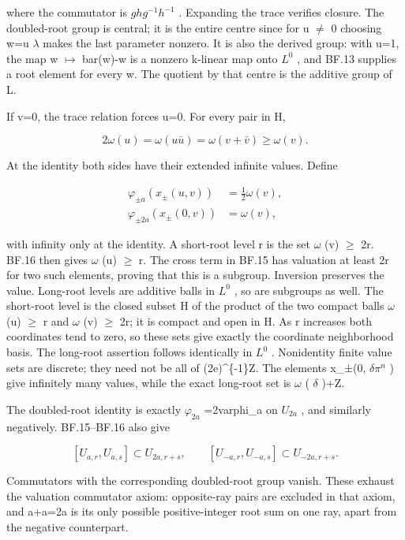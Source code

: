 \documentclass[
  11pt,
]{article}
\begin{document}
where the commutator is \(ghg^{-1} h^{-1}\) . Expanding the trace
verifies closure. The doubled-root group is central; it is the entire
centre since for u \(\ne\) 0 choosing w=u \(\lambda\) makes the last
parameter nonzero. It is also the derived group: with u=1, the map w
\(\mapsto\) bar(w)-w is a nonzero k-linear map onto \(L^0\) , and BF.13
supplies a root element for every w. The quotient by that centre is the
additive group of L.

If v=0, the trace relation forces u=0. For every pair in H,

\[
 2\omega(u)=\omega(u\bar u)
 =\omega(v+\bar v)\ge\omega(v).
 \tag{BF.16}
\]

At the identity both sides have their extended infinite values. Define

\[
 \begin{aligned}
 \varphi_{\pm a}(x_\pm(u,v))&=\tfrac12\omega(v),\\
 \varphi_{\pm2a}(x_\pm(0,v))&=\omega(v),
 \end{aligned}
 \tag{BF.17}
\]

with infinity only at the identity. A short-root level r is the set
\(\omega\) (v) \(\ge\) 2r. BF.16 then gives \(\omega\) (u) \(\ge\) r.
The cross term in BF.15 has valuation at least 2r for two such elements,
proving that this is a subgroup. Inversion preserves the value.
Long-root levels are additive balls in \(L^0\) , so are subgroups as
well. The short-root level is the closed subset H of the product of the
two compact balls \(\omega\) (u) \(\ge\) r and \(\omega\) (v) \(\ge\)
2r; it is compact and open in H. As r increases both coordinates tend to
zero, so these sets give exactly the coordinate neighborhood basis. The
long-root assertion follows identically in \(L^0\) . Nonidentity finite
value sets are discrete; they need not be all of (2e)\^{}\{-1\}Z. The
elements x\_±(0, \(\delta \pi^n\) ) give infinitely many values, while
the exact long-root set is \(\omega\) ( \(\delta\) )+Z.

The doubled-root identity is exactly \(\varphi_{2a}\) =2varphi\_a on
\(U_{2a}\) , and similarly negatively. BF.15--BF.16 also give

\[
 [U_{a,r},U_{a,s}]\subset U_{2a,r+s},\qquad
 [U_{-a,r},U_{-a,s}]\subset U_{-2a,r+s}.
 \tag{BF.18}
\]

Commutators with the corresponding doubled-root group vanish. These
exhaust the valuation commutator axiom: opposite-ray pairs are excluded
in that axiom, and a+a=2a is its only possible positive-integer root sum
on one ray, apart from the negative counterpart.
\end{document}
